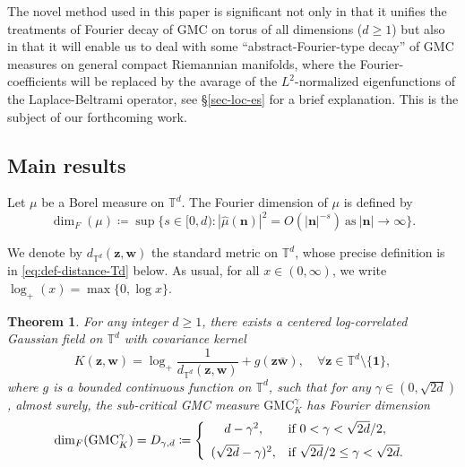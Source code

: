 \documentclass[12pt]{amsart}
\newtheorem{theorem}{Theorem}[section]
\theoremstyle{definition}
\theoremstyle{remark}
\newcommand{\bz}{\boldsymbol{z}}
\newcommand{\bw}{\boldsymbol{w}}
\newcommand{\T}{\mathbb{T}}
\newcommand{\GMC}{\mathrm{GMC}}
\numberwithin{equation}{section}
\begin{document}
The novel method used in this paper is significant not only in that it unifies the treatments of Fourier decay of GMC on torus of all dimensions ($d\ge 1$) but also in that it will enable us to deal with some ``abstract-Fourier-type decay'' of GMC measures on general compact Riemannian manifolds, where the Fourier-coefficients will be replaced by the avarage of  the $L^2$-normalized eigenfunctions of the Laplace-Beltrami operator, see \S \ref{sec-loc-es} for a brief explanation. This is the subject of our forthcoming work. 



\subsection{Main results}

Let $\mu$ be a Borel measure on $\T^d$. The Fourier dimension of $\mu$ is defined by
\begin{equation}\label{eq:def-Fourierdim}
\dim_F(\mu)\coloneq \sup\big\{s\in [0,d):|\widehat{\mu}(\boldsymbol{n})|^2 =  O(|\boldsymbol{n}|^{-s}) ~\text{as}~|\boldsymbol{n}|\to\infty\big\}.
\end{equation}

We denote by $d_{\T^d}(\bz,\bw)$ the standard metric on $\T^d$, whose precise definition is in \eqref{eq:def-distance-Td} below. As usual, for all $x\in (0, \infty)$, we write $\log_+(x)=\max\{0,\log x\}$.
\begin{theorem}\label{thm:Fourier-decay-GMC}
	For any integer $d\ge 1$, there exists a centered log-correlated Gaussian field on $\T^d$ with covariance kernel
	\[
	K(\bz,\bw)=\log_+\frac{1}{d_{\T^d}(\bz,\bw)}+g(\bz\bar{\bw}),\quad \forall \bz\in \T^d\setminus\{\boldsymbol{1}\},
	\] 
	where $g$ is a bounded continuous function on $\T^d$, such that for any $\gamma\in (0,\sqrt{2d})$, almost surely, the sub-critical GMC measure $\GMC_K^\gamma$ has Fourier dimension
	\[
	\dim_F(\GMC_K^\gamma)= D_{\gamma,d}\coloneq \left\{
	\begin{array}{cl}
		d-\gamma^2, & \text{if  $0<\gamma<\sqrt{2d}/2$},
		\vspace{2mm}
		\\
		(\sqrt{2d}-\gamma)^2, & \text{if $\sqrt{2d}/2\leq\gamma<\sqrt{2d}$}.
	\end{array}\right.
	\]
\end{theorem}
\end{document}
